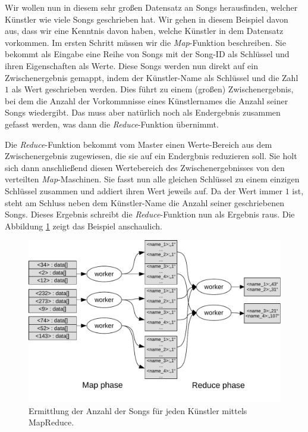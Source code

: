 Wir wollen nun in diesem sehr großen Datensatz an Songs herausfinden, welcher Künstler wie viele Songs geschrieben hat. Wir gehen in diesem Beispiel davon aus, dass wir eine Kenntnis davon haben, welche Künstler in  dem Datensatz vorkommen.
Im ersten Schritt müssen wir die \textit{Map}-Funktion beschreiben. Sie bekommt als Eingabe eine Reihe von Songs mit der Song-ID
als Schlüssel und ihren Eigenschaften als Werte. Diese Songs werden nun direkt auf ein Zwischenergebnis gemappt, indem der
Künstler-Name als Schlüssel und die Zahl $1$ als Wert geschrieben werden. Dies führt zu einem (großen) Zwischenergebnis,
bei dem die Anzahl der Vorkommnisse eines Künstlernames die Anzahl seiner Songs wiedergibt. Das muss aber
natürlich noch als Endergebnis zusammen gefasst werden, was dann die \textit{Reduce}-Funktion übernimmt. 

Die \textit{Reduce}-Funktion bekommt vom Master einen Werte-Bereich aus dem Zwischenergebnis zugewiesen, die sie auf
ein Endergbnis reduzieren soll. Sie holt sich dann anschließend diesen Wertebereich des Zwischenergebnisses von den verteilten
\textit{Map}-Maschinen. Sie fasst nun alle gleichen Schlüssel zu einem einzigen Schlüssel zusammen und addiert 
ihren Wert jeweils auf. Da der Wert immer $1$ ist, steht am Schluss neben dem Künstler-Name die Anzahl seiner geschriebenen
Songs. Dieses Ergebnis schreibt die  \textit{Reduce}-Funktion nun als Ergebnis raus. Die Abbildung \ref{fig:mapreduceExample} zeigt 
das Beispiel anschaulich.

\begin{figure}
\centering
\includegraphics[width=1.0\textwidth]{images/mapreduceExample.pdf}
\caption{Ermittlung der Anzahl der Songs für jeden Künstler mittels MapReduce.}
\label{fig:mapreduceExample}
\end{figure}

%

